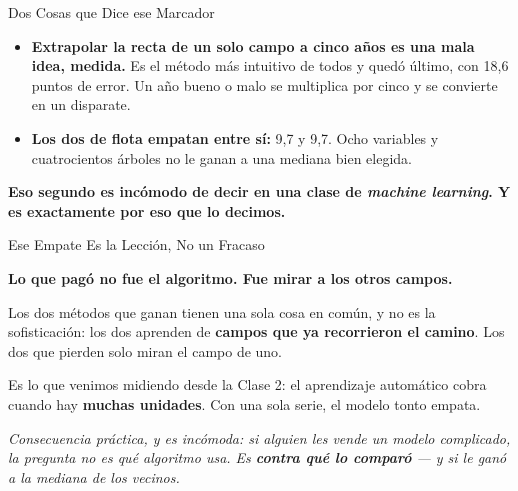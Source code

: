 \documentclass[aspectratio=169, 11pt]{beamer}
\begin{document}
\begin{frame}[shrink=8]{Dos Cosas que Dice ese Marcador}
  \vspace{4pt}
  {\footnotesize\color{textMuted}
  \begin{itemize}\setlength{\itemsep}{9pt}
    \item[{\color{arcaRed}\scriptsize\faTimes}]
      \textbf{Extrapolar la recta de un solo campo a cinco años es una mala
      idea, medida.} Es el método más intuitivo de todos y quedó último, con
      18,6 puntos de error. Un año bueno o malo se multiplica por cinco y se
      convierte en un disparate.
    \item[{\color{codeGreen}\scriptsize\faCheck}]
      \textbf{Los dos de flota empatan entre sí:} 9,7 y 9,7. Ocho variables y
      cuatrocientos árboles no le ganan a una mediana bien elegida.
  \end{itemize}}
  \vspace{9pt}
  \begin{tcolorbox}[colback=arcaGray, colframe=arcaRed, boxrule=0pt,
    leftrule=4pt, arc=3pt, left=10pt, right=10pt, top=7pt, bottom=7pt]
    {\footnotesize\color{arcaDark}\bfseries
     Eso segundo es incómodo de decir en una clase de \emph{machine learning}.
     Y es exactamente por eso que lo decimos.}
  \end{tcolorbox}
\end{frame}

\begin{frame}[shrink=8]{Ese Empate Es la Lección, No un Fracaso}
  \vspace{6pt}
  \begin{tcolorbox}[colback=arcaGray, colframe=arcaRed, boxrule=0pt,
    leftrule=4pt, arc=3pt, left=10pt, right=10pt, top=8pt, bottom=8pt]
    {\large\color{arcaDark}\bfseries
     Lo que pagó no fue el algoritmo. Fue \textbf{mirar a los otros campos}.}
  \end{tcolorbox}
  \vspace{9pt}
  {\footnotesize\color{textMuted}
   Los dos métodos que ganan tienen una sola cosa en común, y no es la
   sofisticación: los dos aprenden de \textbf{campos que ya recorrieron el
   camino}. Los dos que pierden solo miran el campo de uno.
   \vspace{7pt}

   Es lo que venimos midiendo desde la Clase 2: el aprendizaje automático
   cobra cuando hay \textbf{muchas unidades}. Con una sola serie, el modelo
   tonto empata.}
  \vspace{9pt}
  {\footnotesize\color{arcaDark}\itshape
   Consecuencia práctica, y es incómoda: si alguien les vende un modelo
   complicado, la pregunta no es qué algoritmo usa. Es \textbf{contra qué lo
   comparó} --- y si le ganó a la mediana de los vecinos.}
\end{frame}
\end{document}
